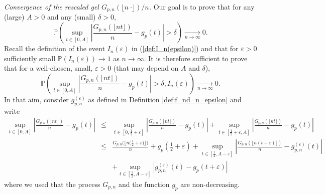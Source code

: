 \documentclass[a4, 11pt]{article}
\numberwithin{equation}{section}
\theoremstyle{plain}
\theoremstyle{definition}
\theoremstyle{remark}
\begin{document}
\emph{Convergence of the rescaled gel $G_{p,n}(\lfloor n~\cdot \rfloor)/n$.} Our goal is to prove that for any (large) $A>0$ and any (small) $\delta>0$,
$$
\mathbb P\left(\sup_{t \in [0,A]}\left \vert \frac{G_{p,n}\left(\lfloor nt\rfloor\right)}{n} -g_p(t) \right\vert >\delta\right) \underset{n \rightarrow \infty}\longrightarrow 0. 
$$
Recall the definition of the event $I_n(\varepsilon)$ in (\ref{def:I_n(epsilon)}) and that for $\varepsilon>0$ sufficiently small $\mathbb P(I_n(\varepsilon))\rightarrow 1$ as $n \rightarrow \infty$. It is therefore sufficient to prove that for a well-chosen, small, $\varepsilon>0$ (that may depend on $A$ and $\delta$),
\begin{equation}
\label{cv_X_A}
\mathbb P\left(\sup_{t \in [0,A]}\left \vert \frac{G_{p,n}\left(\lfloor nt\rfloor\right)}{n} -g_p(t) \right\vert >\delta, I_n(\varepsilon)\right) \underset{n \rightarrow \infty}\longrightarrow 0. 
\end{equation}
In that aim, consider $g_{p,n}^{(\varepsilon)}$ as defined in Definition \ref{def:f_nd_n_epsilon} and write
\begin{eqnarray*}
\sup_{t \in [0,A]}\left \vert \frac{G_{p,n}\left(\lfloor nt\rfloor\right)}{n} -g_p(t) \right\vert &\leq& \sup_{t \in \left[0,\frac{1}{2}+\varepsilon\right]}\left \vert \frac{G_{p,n}\left(\lfloor nt\rfloor\right)}{n} -g_p(t) \right\vert +\sup_{t \in \left[\frac{1}{2}+\varepsilon,A\right]}\left \vert \frac{G_{p,n}\left(\lfloor nt\rfloor\right)}{n} -g_p(t) \right\vert \\
&\leq &  \frac{G_{p,n}\big(\big\lfloor n\big(\frac{1}{2}+\varepsilon\big)\big\rfloor\big)}{n} +g_p\left(\frac{1}{2}+\varepsilon\right) + \sup_{t \in \left[\frac{1}{2},A-\varepsilon\right]}\left \vert \frac{G_{p,n}\left(\lfloor n(t+\varepsilon)\rfloor\right)}{n} -g^{(\varepsilon)}_{p,n}(t) \right\vert \\
&&+ \sup_{t \in \left[\frac{1}{2},A-\varepsilon\right]}\left \vert  g^{(\varepsilon)}_{p,n}(t) -g_p(t+\varepsilon) \right\vert
\end{eqnarray*}
where we used that the process $G_{p,n}$ and the function $g_p$ are non-decreasing. 
\end{document}
